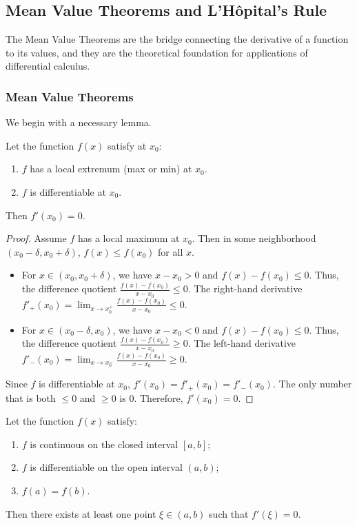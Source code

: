 \documentclass[oneside]{book}
\begin{document}
\subsection{Mean Value Theorems and L'Hôpital's Rule}

The Mean Value Theorems are the bridge connecting the derivative of a function to its values, and they are the theoretical foundation for applications of differential calculus.

\subsubsection{Mean Value Theorems}

We begin with a necessary lemma.

\begin{theorem}
Let the function $f(x)$ satisfy at $x_0$:
\begin{enumerate}
    \item $f$ has a local extremum (max or min) at $x_0$.
    \item $f$ is differentiable at $x_0$.
\end{enumerate}
Then $f'(x_0) = 0$.
\end{theorem}

\begin{proof}
Assume $f$ has a local maximum at $x_0$. Then in some neighborhood $(x_0-\delta, x_0+\delta)$, $f(x) \leq f(x_0)$ for all $x$.
\begin{itemize}
    \item For $x \in (x_0, x_0+\delta)$, we have $x - x_0 > 0$ and $f(x) - f(x_0) \leq 0$.
    Thus, the difference quotient $\frac{f(x) - f(x_0)}{x - x_0} \leq 0$.
    The right-hand derivative $f'_+(x_0) = \lim_{x \to x_0^+} \frac{f(x) - f(x_0)}{x - x_0} \leq 0$.
    
    \item For $x \in (x_0-\delta, x_0)$, we have $x - x_0 < 0$ and $f(x) - f(x_0) \leq 0$.
    Thus, the difference quotient $\frac{f(x) - f(x_0)}{x - x_0} \geq 0$.
    The left-hand derivative $f'_-(x_0) = \lim_{x \to x_0^-} \frac{f(x) - f(x_0)}{x - x_0} \geq 0$.
\end{itemize}
Since $f$ is differentiable at $x_0$, $f'(x_0) = f'_+(x_0) = f'_-(x_0)$.
The only number that is both $\leq 0$ and $\geq 0$ is $0$.
Therefore, $f'(x_0) = 0$.
\end{proof}

\begin{theorem}
\label{thm:rolle_en}
Let the function $f(x)$ satisfy:
\begin{enumerate}
    \item $f$ is continuous on the closed interval $[a, b]$;
    \item $f$ is differentiable on the open interval $(a, b)$;
    \item $f(a) = f(b)$.
\end{enumerate}
Then there exists at least one point $\xi \in (a, b)$ such that $f'(\xi) = 0$.
\end{theorem}
\end{document}
